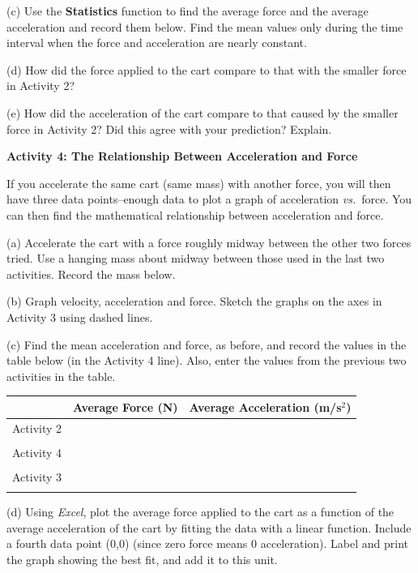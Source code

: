 (c) Use the \textbf{Statistics} function to find the average force and the average acceleration
and record them below. Find the mean values only during the time interval when
the force and acceleration are nearly constant.
\answerspace{15mm}

(d) How did the force applied to the cart compare to that with the smaller force
in Activity 2?
\answerspace{15mm}

(e) How did the acceleration of the cart compare to that caused by the smaller
force in Activity 2? Did this agree with your prediction? Explain.
\answerspace{15mm}

\pagebreak[2]
\textbf{Activity 4: The Relationship Between Acceleration and Force }

If you accelerate the same cart (same mass) with another force, you will then
have three data points--enough data to plot a graph of acceleration \textit{vs.}~force.
You can then find the mathematical relationship between acceleration and force. 

(a) Accelerate the cart with a force roughly midway between the other two forces
tried. Use a hanging mass about midway between those used in the last two activities.
Record the mass below.
\answerspace{10mm}

(b) Graph velocity, acceleration and force. Sketch the graphs on the axes in
Activity 3 using dashed lines.

(c) Find the mean acceleration and force, as before, and record the values in
the table below (in the Activity 4 line). Also, enter the values from the previous two activities in the table.

\vspace{0.3cm}
{\centering \begin{tabular}{|c|c|c|}
\hline 
&
Average Force (N)&
Average Acceleration (m/s\( ^{2} \))\\
\hline 
Activity 2&
&
\\
&
&
\\
\hline 
Activity 4&
&
\\
&
&
\\
\hline 
Activity 3&
&
\\
&
&
\\
\hline 
\end{tabular}\par}
\vspace{0.3cm}

(d) Using \textit{Excel}, plot the average force applied to the cart as a function of the average acceleration of the cart by fitting the data with a linear function. Include a fourth data point (0,0) (since zero force means 0 acceleration). Label and print the graph showing the best fit, and add it to this unit.

